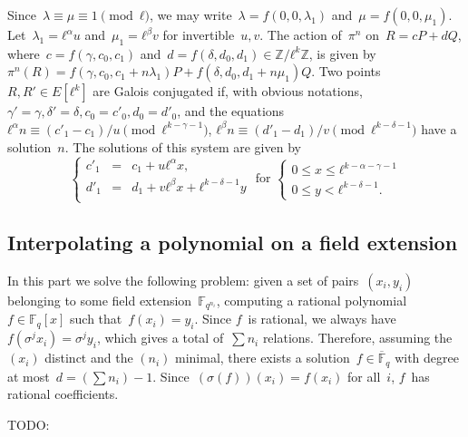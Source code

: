 \documentclass{lms}
\newcommand{\todo}[1]{{\color{red}TODO: #1}}
\newcommand{\F}{\mathbb{F}}
\begin{document}
Since~$λ ≡ μ ≡ 1 \pmod{ℓ}$,
we may write~$λ = f(0, 0, λ_1)$ and~$μ = f(0, 0, μ_1)$.
Let~$λ_1 = ℓ^α u$ and~$μ_1 = ℓ^β v$ for invertible~$u, v$.
The action of~$π^n$ on~$R = c P + d Q$,
where~$c = f(γ, c_0, c_1)$ and~$d = f(δ, d_0, d_1) ∈ ℤ/ℓ^{k} ℤ$,
is given by~$π^n (R) = f(γ, c_0, c_1 + n λ_1) P + f(δ, d_0, d_1 + n μ_1) Q$.
Two points~$R, R' ∈ E[ℓ^k]$ are Galois conjugated if, with obvious notations,
$γ' = γ, δ' = δ, c_0 = c'_0, d_0 = d'_0$, and the equations
$ℓ^α n ≡ (c'_1 - c_1)/u \pmod{ℓ^{k-γ-1}}$,
$ℓ^β n ≡ (d'_1 - d_1)/v \pmod{ℓ^{k-δ-1}}$ have a solution~$n$.
The solutions of this system are given by
\begin{equation*}
\left\{\begin{array}{rcl}
c'_1 &=& c_1 + u ℓ^α x,\\
d'_1 &=& d_1 + v ℓ^β x + ℓ^{k-δ-1} y\\\end{array}\right.
\text{ for }\left\{\begin{array}{l}
0 ≤ x ≤ ℓ^{k-α-γ-1}\\
0 ≤ y < ℓ^{k-δ-1}.\end{array}\right.
\end{equation*}


\subsection{Interpolating a polynomial on a field extension}

In this part we solve the following problem:
given a set of pairs~$(x_i, y_i)$ belonging to
some field extension~$\F_{q^{n_i}}$,
computing a rational polynomial~$f ∈ \F_q[x]$ such that~$f(x_i) = y_i$.
Since $f$~is rational, we always have~$f(σ^j x_i) = σ^j y_i$,
which gives a total of~$∑ n_i$ relations.
Therefore, assuming the $(x_i)$ distinct and the $(n_i)$ minimal,
there exists a solution~$f ∈ \overline{\F}_{q}$
with degree at most~$d = (∑ n_i) - 1$.
Since~$(σ(f)) (x_i) = f(x_i)$ for all~$i$, $f$~has rational coefficients.

\todo{\vrule height 1pt width 10cm}
\end{document}
